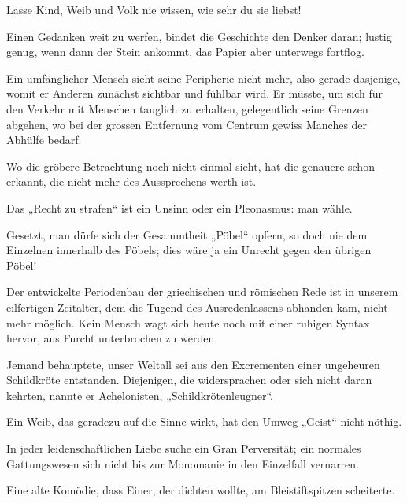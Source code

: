 Lasse Kind, Weib und Volk nie wissen, wie sehr du sie liebst!
\par

Einen Gedanken weit zu werfen, bindet die Geschichte den Denker daran; lustig genug, wenn dann der Stein ankommt, das Papier aber unterwegs fortflog.
\par

Ein umfänglicher Mensch sieht seine Peripherie nicht mehr, also gerade dasjenige, womit er Anderen zunächst sichtbar und fühlbar wird. Er müsste, um sich für den Verkehr mit Menschen tauglich zu erhalten, gelegentlich seine Grenzen abgehen, wo bei der grossen Entfernung vom Centrum gewiss Manches der Abhülfe bedarf.
\par

Wo die gröbere Betrachtung noch nicht einmal  sieht, hat die genauere schon  erkannt, die nicht mehr des Aussprechens werth ist.
\par

Das „Recht zu strafen“ ist ein Unsinn oder ein Pleonasmus: man wähle.
\par

Gesetzt, man dürfe sich der Gesammtheit „Pöbel“ opfern, so doch nie dem Einzelnen innerhalb des Pöbels; dies wäre ja ein Unrecht gegen den übrigen Pöbel!
\par

Der entwickelte Periodenbau der griechischen und römischen Rede ist in unserem eilfertigen Zeitalter, dem die Tugend des Ausredenlassens abhanden kam, nicht mehr möglich. Kein Mensch wagt sich heute noch mit einer ruhigen Syntax hervor, aus Furcht unterbrochen zu werden.
\par

Jemand behauptete, unser Weltall sei aus den Excrementen einer ungeheuren Schildkröte entstanden. Diejenigen, die widersprachen oder sich nicht daran kehrten, nannte er Achelonisten, „Schildkrötenleugner“.
\par

Ein Weib, das geradezu auf die Sinne wirkt, hat den Umweg „Geist“ nicht nöthig.
\par

In jeder leidenschaftlichen Liebe suche ein Gran Perversität; ein normales Gattungswesen  sich nicht bis zur Monomanie in den Einzelfall vernarren.
\par

Eine alte Komödie, dass Einer, der dichten wollte, am Bleistiftspitzen scheiterte.
\par

